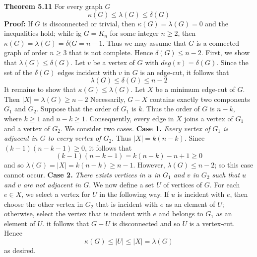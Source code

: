 \nopagenumbers
{\bf Theorem 5.11}
\vskip 6pt
For every graph $G$ $$ \kappa (G) \leq \lambda (G) \leq \delta (G)$$
\vskip 10pt
{\bf Proof:}
\vskip 6pt
If $G$ is disconnected or trivial, then $\kappa (G)= \lambda (G)=0$ and the inequalities hold; while ig $G=K_n$ for some integer $n \geq 2$, then $\kappa (G)= \lambda (G) = \delta (G=n-1$. Thus we may assume that $G$ is a connected graph of order $n \geq 3$ that is not complete. Hence $\delta (G)\leq n-2$.
\vskip 1mm
First, we show that $\lambda (G) \leq \delta (G)$. Let $v$ be a vertex of $G$ with $deg(v)= \delta (G)$. Since the set of the $\delta (G)$ edges incident with $v$ in $G$ is an edge-cut, it follows that $$\lambda (G) \leq \delta (G) \leq n-2$$
It remains to show that $\kappa (G) \leq \lambda (G)$. Let $X$ be a minimum edge-cut of $G$. Then $|X|= \lambda (G) \geq n-2$ Necessarily, $G-X$ contains exactly two components $G_1$ and $G_2$. Suppose that the order of $G_1$ is $k$. Thus the order of $G$ is $n-k$, where $k \geq 1$ and $n-k \geq 1$. Consequently, every edge in $X$ joins a vertex of $G_1$ and a vertex of $G_2$. We consider two cases.
\vskip 1mm
{\bf Case 1.} {\it Every vertex of $G_1$ is adjacent in $G$ to every vertex of $G_2$}. Thus $|X|=k(n-k)$. Since $(k-1)(n-k-1) \geq 0$, it follows that $$(k-1)(n-k-1)=k(n-k)-n+1 \geq 0$$ and so $\lambda (G)= |X|=k(n-k) \geq n-1$. However, $\lambda (G) \leq n-2$; so this case cannot occur.
\vskip 1mm
{\bf Case 2.} {\it There exists vertices in $u$ in $G_1$ and $v$ in $G_2$ such that $u$ and $v$ are not adjacent in $G$}. We now define a set $U$ of vertices of $G$. For each $e \in X$, we select a vertex for $U$ in the following way. If $u$ is incident with $e$, then choose the other vertex in $G_2$ that is incident with $e$ as an element of $U$; otherwise, select the vertex that is incident with $e$ and belongs to $G_1$ as an element of $U$. it follows that $G-U$ is disconnected and so $U$ is a vertex-cut. Hence $$ \kappa (G) \leq |U| \leq |X|= \lambda (G)$$ as desired.

\vfill\eject
